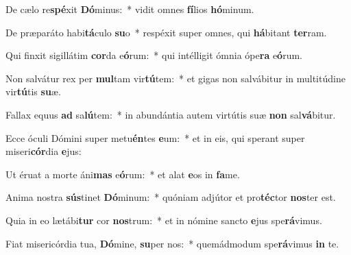 \item De cælo re\textbf{spé}xit \textbf{Dó}minus:~* vidit omnes \textbf{fí}lios \textbf{hó}minum.
\item De præparáto habi\textbf{tá}culo \textbf{su}o~* respéxit super omnes, qui \textbf{há}bitant \textbf{ter}ram.
\item Qui finxit sigillátim \textbf{cor}da e\textbf{ó}rum:~* qui intélligit ómnia ópe\textbf{ra} e\textbf{ó}rum.
\item Non salvátur rex per \textbf{mul}tam vir\textbf{tú}tem:~* et gigas non salvábitur in multitúdine vir\textbf{tú}tis \textbf{su}æ.
\item Fallax equus \textbf{ad} sa\textbf{lú}tem:~* in abundántia autem virtútis suæ \textbf{non} sal\textbf{vá}bitur.
\item Ecce óculi Dómini super metu\textbf{én}tes \textbf{e}um:~* et in eis, qui sperant super miseri\textbf{cór}dia \textbf{e}jus:
\item Ut éruat a morte áni\textbf{mas} e\textbf{ó}rum:~* et alat \textbf{e}os in \textbf{fa}me.
\item Anima nostra \textbf{sús}tinet \textbf{Dó}minum:~* quóniam adjútor et pro\textbf{téc}tor \textbf{nos}ter est.
\item Quia in eo lætábi\textbf{tur} cor \textbf{nos}trum:~* et in nómine sancto \textbf{e}jus spe\textbf{rá}vimus.
\item Fiat misericórdia tua, \textbf{Dó}mine, \textbf{su}per nos:~* quemádmodum spe\textbf{rá}vimus \textbf{in} te.
